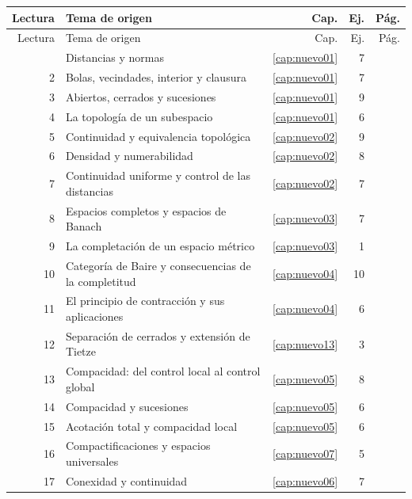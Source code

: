 \footnotesize
\begin{longtable}{@{}r>{\raggedright\arraybackslash}p{}rrr@{}}
\toprule
Lectura & Tema de origen & Cap. & Ej. & Pág.\\\midrule
\endfirsthead
\toprule Lectura & Tema de origen & Cap. & Ej. & Pág.\\\midrule
\endhead
\bottomrule\endfoot
1 & Distancias y normas & \ref{cap:nuevo01} & 7 & \pageref{lectura:01}\\
2 & Bolas, vecindades, interior y clausura & \ref{cap:nuevo01} & 7 & \pageref{lectura:02}\\
3 & Abiertos, cerrados y sucesiones & \ref{cap:nuevo01} & 9 & \pageref{lectura:03}\\
4 & La topología de un subespacio & \ref{cap:nuevo01} & 6 & \pageref{lectura:04}\\
5 & Continuidad y equivalencia topológica & \ref{cap:nuevo02} & 9 & \pageref{lectura:05}\\
6 & Densidad y numerabilidad & \ref{cap:nuevo02} & 8 & \pageref{lectura:06}\\
7 & Continuidad uniforme y control de las distancias & \ref{cap:nuevo02} & 7 & \pageref{lectura:07}\\
8 & Espacios completos y espacios de Banach & \ref{cap:nuevo03} & 7 & \pageref{lectura:08}\\
9 & La completación de un espacio métrico & \ref{cap:nuevo03} & 1 & \pageref{lectura:09}\\
10 & Categoría de Baire y consecuencias de la completitud & \ref{cap:nuevo04} & 10 & \pageref{lectura:10}\\
11 & El principio de contracción y sus aplicaciones & \ref{cap:nuevo04} & 6 & \pageref{lectura:11}\\
12 & Separación de cerrados y extensión de Tietze & \ref{cap:nuevo13} & 3 & \pageref{lectura:12}\\
13 & Compacidad: del control local al control global & \ref{cap:nuevo05} & 8 & \pageref{lectura:13}\\
14 & Compacidad y sucesiones & \ref{cap:nuevo05} & 6 & \pageref{lectura:14}\\
15 & Acotación total y compacidad local & \ref{cap:nuevo05} & 6 & \pageref{lectura:15}\\
16 & Compactificaciones y espacios universales & \ref{cap:nuevo07} & 5 & \pageref{lectura:16}\\
17 & Conexidad y continuidad & \ref{cap:nuevo06} & 7 & \pageref{lectura:17}\\

\end{longtable}
